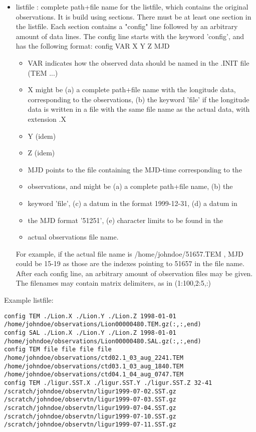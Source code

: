 \documentclass[a4paper,12pt]{article}
\begin{document}
\begin{itemize}
\item listfile : complete path+file name for the listfile, which contains the original observations. It is build using sections. There must be at least one section in the listfile. Each section contains a "config" line followed by an arbitrary amount of data lines.
The config line starts with the keyword 'config', and has the
following format: config VAR X Y Z MJD\\
\begin{itemize}
\item VAR indicates how the observed data should be named in the .INIT file (TEM ...)\\
\item X might be (a) a complete path+file name with the longitude data, corresponding to the observations, (b) the keyword 'file' if the longitude data is written in a file with the same file name as the actual data, with extension .X\\
\item Y (idem)\\
\item Z (idem)\\
\item MJD points to the file containing the MJD-time corresponding to the
\item observations, and might be (a) a complete path+file name, (b) the
\item keyword 'file', (c) a datum in the format 1999-12-31, (d) a datum in
\item the MJD format '51251', (e) character limits to be found in the
\item actual observations file name.\\
\end{itemize}
For example, if the actual file name is /home/johndoe/51657.TEM , MJD could be 15-19 as those are the indexes pointing to 51657 in the file name.
After each config line, an arbitrary amount of observation files may be given.
The filenames may contain matrix delimiters, as in (1:100,2:5,:)\\
\end{itemize}

Example listfile:
\begin{verbatim}
config TEM ./Lion.X ./Lion.Y ./Lion.Z 1998-01-01
/home/johndoe/observations/Lion00000480.TEM.gz(:,:,end)
config SAL ./Lion.X ./Lion.Y ./Lion.Z 1998-01-01
/home/johndoe/observations/Lion00000480.SAL.gz(:,:,end)
config TEM file file file file
/home/johndoe/observations/ctd02.1_03_aug_2241.TEM
/home/johndoe/observations/ctd03.1_03_aug_1840.TEM
/home/johndoe/observations/ctd04.1_04_aug_0747.TEM
config TEM ./ligur.SST.X ./ligur.SST.Y ./ligur.SST.Z 32-41
/scratch/johndoe/observtn/ligur1999-07-02.SST.gz
/scratch/johndoe/observtn/ligur1999-07-03.SST.gz
/scratch/johndoe/observtn/ligur1999-07-04.SST.gz
/scratch/johndoe/observtn/ligur1999-07-10.SST.gz
/scratch/johndoe/observtn/ligur1999-07-11.SST.gz
\end{verbatim}
\end{document}
